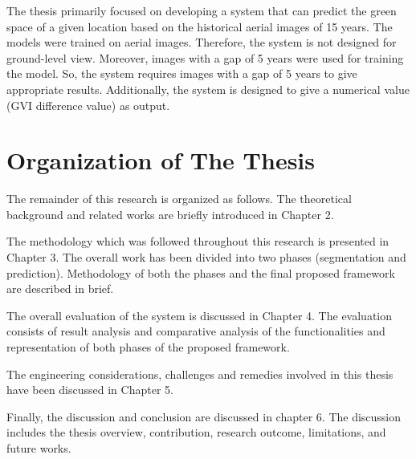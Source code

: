 The thesis primarily focused on developing a system that can predict the green space of a given location based on the historical aerial images of 15 years. The models were trained on aerial images. Therefore, the system is not designed for ground-level view. Moreover, images with a gap of 5 years were used for training the model. So, the system requires images with a gap of 5 years to give appropriate results. Additionally, the system is designed to give a numerical value (GVI difference value) as output.  \
 

\section{Organization of The Thesis}

The remainder of this research is organized as follows. 
The theoretical background and related works are briefly introduced in Chapter 2. 

The methodology which was followed throughout this research is presented in Chapter 3. The overall work has been divided into two phases (segmentation and prediction). Methodology of both the phases and the final proposed framework are described in brief.

 The overall evaluation of the system is discussed in Chapter 4. The evaluation consists of result analysis and comparative analysis of the functionalities and representation of both phases of the proposed framework. 
 
 The engineering considerations, challenges and remedies involved in this thesis have been discussed in Chapter 5.

 Finally, the discussion and conclusion are discussed in chapter 6. The discussion includes the thesis overview, contribution, research outcome, limitations, and future works.

